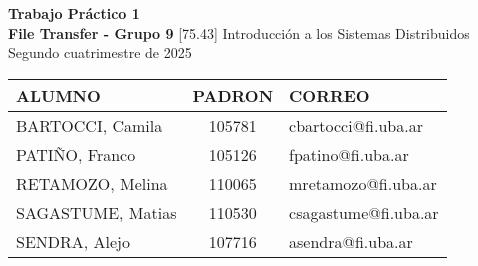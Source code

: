\begin{titlepage} %
    \centering
    \vfill
    \Huge \textbf{Trabajo Práctico 1 \\ File Transfer - Grupo 9}
    \vskip2cm
    \Large [75.43] Introducción a los Sistemas Distribuidos\\
    Segundo cuatrimestre de 2025
    \vfill
    \vfill
    \begin{tabular}{ | l | c | l | }
      \hline
      ALUMNO & PADRON & CORREO \\ \hline
      BARTOCCI, Camila & 105781 & cbartocci@fi.uba.ar \\ \hline
      PATIÑO, Franco & 105126 & fpatino@fi.uba.ar \\ \hline
      RETAMOZO, Melina & 110065 & mretamozo@fi.uba.ar \\ \hline
      SAGASTUME, Matias & 110530 & csagastume@fi.uba.ar \\ \hline
      SENDRA, Alejo & 107716 & asendra@fi.uba.ar \\ \hline

  	\end{tabular}
    \vfill
    \vfill
\end{titlepage}